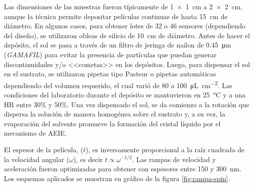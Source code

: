 			Las dimensiones de las muestras fueron típicamente de \SI{1x1}{\cm} a \linebreak \SI{2x2}{\cm}, aunque la técnica permite depositar películas continuas de hasta \SI{15}{cm} de diámetro. En algunos casos, para obtener lotes de 32 o 46 sensores (dependiendo del diseño), se utilizaron obleas de silicio de \SI{10}{\cm} de diámetro. Antes de hacer el depósito, el sol se pasa a través de un filtro de jeringa de nailon de \SI{0.45}{\um} (\textit{GAMAFIL}) para evitar la presencia de partículas que puedan generar discontinuidades y/o <<cometas>> en los depósitos\cite{Franssila2004}. Luego, para dispensar el sol en el sustrato, se utilizaron pipetas tipo Pasteur o pipetas automáticas dependiendo del volumen requerido, el cual varió de 80 a \SI{100}{\uL.\cm^{-2}}. Las condiciones del laboratorio durante el depósito se mantuvieron en \SI{25}{\celsius} y a una HR entre 30\% y 50\%. Una vez dispensado el sol, se da comienzo a la rotación que dispersa la solución de manera homogénea sobre el sustrato y, a su vez, la evaporación del solvente promueve la formación del cristal líquido por el mecanismo de AEIE\cite{Brinker1999}.


			El espesor de la película, ($t$), es inversamente proporcional a la raíz cuadrada de la velocidad angular ($\omega$), es decir $t\propto \omega ^{-1/2}$. Las rampas de velocidad y aceleración fueron optimizadas para obtener \pdm\space con espesores entre 150 y \SI{300}{\nm}\cite{Meyerhofer1978,Hall1998,Brinker1990}. Los esquemas aplicados se muestran en gráfico de la figura \ref{fig:rampa-spin}. 
				
